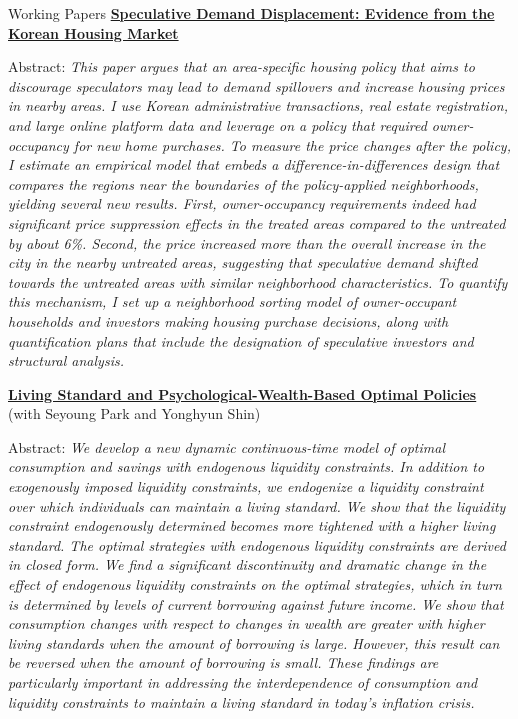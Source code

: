 \documentclass{resume} %
\begin{document}
	\begin{rSection}{Working Papers}
		\href{chanwoolkim.github.io}{\textbf{Speculative Demand Displacement: Evidence from the Korean Housing Market}}
		
		Abstract: \textit{This paper argues that an area-specific housing policy that aims to discourage speculators may lead to demand spillovers and increase housing prices in nearby areas. I use Korean administrative transactions, real estate registration, and large online platform data and leverage on a policy that required owner-occupancy for new home purchases. To measure the price changes after the policy, I estimate an empirical model that embeds a difference-in-differences design that compares the regions near the boundaries of the policy-applied neighborhoods, yielding several new results. First, owner-occupancy requirements indeed had significant price suppression effects in the treated areas compared to the untreated by about 6\%. Second, the price increased more than the overall increase in the city in the nearby untreated areas, suggesting that speculative demand shifted towards the untreated areas with similar neighborhood characteristics. To quantify this mechanism, I set up a neighborhood sorting model of owner-occupant households and investors making housing purchase decisions, along with quantification plans that include the designation of speculative investors and structural analysis.}
		
		\href{chanwoolkim.github.io}{\textbf{Living Standard and Psychological-Wealth-Based Optimal Policies}} \\ (with Seyoung Park and Yonghyun Shin)
		
		Abstract: \textit{We develop a new dynamic continuous-time model of optimal consumption and savings with endogenous liquidity constraints. In addition to exogenously imposed liquidity constraints, we endogenize a liquidity constraint over which individuals can maintain a living standard. We show that the liquidity constraint endogenously determined becomes more tightened with a higher living standard. The optimal strategies with endogenous liquidity constraints are derived in closed form. We find a significant discontinuity and dramatic change in the effect of endogenous liquidity constraints on the optimal strategies, which in turn is determined by levels of current borrowing against future income. We show that consumption changes with respect to changes in wealth are greater with higher living standards when the amount of borrowing is large. However, this result can be reversed when the amount of borrowing is small. These findings are particularly important in addressing the interdependence of consumption and liquidity constraints to maintain a living standard in today's inflation crisis.}
	

\end{rSection}
\end{document}
